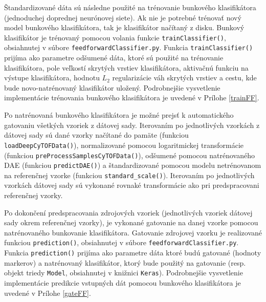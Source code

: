 Štandardizované dáta sú následne použité na trénovanie bunkového klasifikátora (jednoduchej doprednej neurónovej siete). Ak nie je potrebné trénovať nový model bunkového klasifikátora, tak je klasifikátor načítaný z disku. Bunkový klasifikátor je trénovaný pomocou volania funkcie \texttt{trainClassifier()}, obsiahnutej v súbore \texttt{feedforwardClassifier.py}. Funkcia \texttt{trainClassifier()} prijíma ako parametre odšumené dáta, ktoré sú použité na trénovanie klasifikátora, pole veľkostí skrytých vrstiev klasifikátora, aktivačnú funkciu na výstupe klasifikátora, hodnotu $L_2$ regularizácie váh skrytých vrstiev a cestu, kde bude novo-natrénovaný klasifikátor uložený. Podrobnejšie vysvetlenie implementácie trénovania bunkového klasifikátora je uvedené v Prílohe \ref{trainFF}.

Po natrénovaná bunkového klasifikátora je možné prejsť k automatického gatovaniu všetkých vzoriek z dátovej sady. Iterovaním po jednotlivých vzorkách z dátovej sady sú dané vzorky načítané do pamäte (funkciou \texttt{loadDeepCyTOFData()}), normalizované pomocou logaritmickej transformácie (funkciou \texttt{preProcessSamplesCyTOFData()}), odšumené pomocou natrénovaného DAE (funkciou \texttt{predictDAE()}) a štandardizované pomocou modelu netrénovanom na referenčnej vzorke (funkciou \texttt{standard_scale()}). Iterovaním po jednotlivých vzorkách dátovej sady sú vykonané rovnaké transformácie ako pri predspracovani referenčnej vzorky. 

Po dokončení predspracovania zdrojových vzoriek (jednotlivých vzoriek dátovej sady okrem referenčnej vzorky), je vykonané gatovanie na danej vzorke pomocou natrénovaného bunkovanie klasifikátora. Gatovanie zdrojovej vzorku je realizované funkciou \texttt{prediction()}, obsiahnutej v súbore \texttt{feedforwardClassifier.py}. Funkcia \texttt{prediction()} prijíma ako parametre dáta ktoré budú gatované (hodnoty markerov) a natrénovaný klasifikátor, ktorý bude použitý na gatovanie (resp. objekt triedy \texttt{Model}, obsiahnutej v knižnici \texttt{Keras}). Podrobnejšie vysvetlenie implementácie predikcie vstupných dát pomocou bunkového klasifikátora je uvedené v Prílohe \ref{gateFF}.

